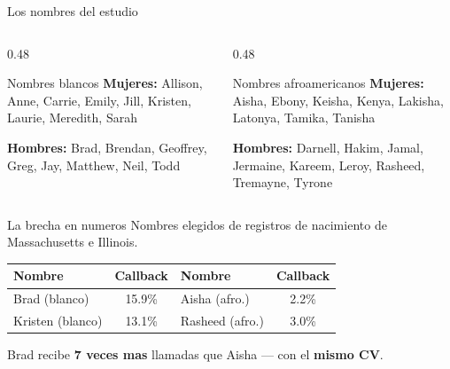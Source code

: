 \documentclass[aspectratio=169, 11pt]{beamer}
\begin{document}
\begin{frame}{Los nombres del estudio}
\footnotesize
\begin{columns}[T]
\begin{column}{0.48\textwidth}
\begin{block}{Nombres blancos}
\scriptsize
\textbf{Mujeres:} Allison, Anne, Carrie, Emily, Jill, Kristen, Laurie, Meredith, Sarah

\vspace{1pt}
\textbf{Hombres:} Brad, Brendan, Geoffrey, Greg, Jay, Matthew, Neil, Todd
\end{block}
\end{column}

\begin{column}{0.48\textwidth}
\begin{block}{Nombres afroamericanos}
\scriptsize
\textbf{Mujeres:} Aisha, Ebony, Keisha, Kenya, Lakisha, Latonya, Tamika, Tanisha

\vspace{1pt}
\textbf{Hombres:} Darnell, Hakim, Jamal, Jermaine, Kareem, Leroy, Rasheed, Tremayne, Tyrone
\end{block}
\end{column}
\end{columns}

\vspace{0.2cm}
\begin{alertblock}{La brecha en numeros}
\scriptsize Nombres elegidos de registros de nacimiento de Massachusetts e Illinois.
\begin{center}
\scriptsize
\begin{tabular}{lclc}
\toprule
\textbf{Nombre} & \textbf{Callback} & \textbf{Nombre} & \textbf{Callback} \\
\midrule
Brad (blanco) & 15.9\% & Aisha (afro.) & 2.2\% \\
Kristen (blanco) & 13.1\% & Rasheed (afro.) & 3.0\% \\
\bottomrule
\end{tabular}
\end{center}
Brad recibe \textbf{7 veces mas} llamadas que Aisha --- con el \textbf{mismo CV}.
\end{alertblock}
\end{frame}
\end{document}
